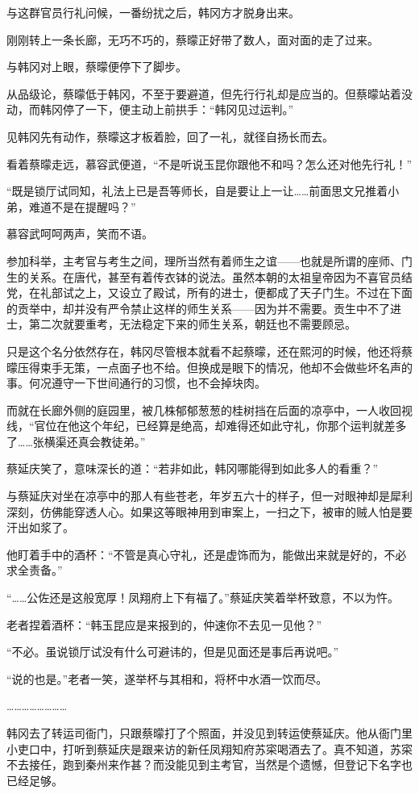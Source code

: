 与这群官员行礼问候，一番纷扰之后，韩冈方才脱身出来。

刚刚转上一条长廊，无巧不巧的，蔡曚正好带了数人，面对面的走了过来。

与韩冈对上眼，蔡曚便停下了脚步。

从品级论，蔡曚低于韩冈，不至于要避道，但先行行礼却是应当的。但蔡曚站着没动，而韩冈停了一下，便主动上前拱手：“韩冈见过运判。”

见韩冈先有动作，蔡曚这才板着脸，回了一礼，就径自扬长而去。

看着蔡曚走远，慕容武便道，“不是听说玉昆你跟他不和吗？怎么还对他先行礼！”

“既是锁厅试同知，礼法上已是吾等师长，自是要让上一让……前面思文兄推着小弟，难道不是在提醒吗？”

慕容武呵呵两声，笑而不语。

参加科举，主考官与考生之间，理所当然有着师生之谊——也就是所谓的座师、门生的关系。在唐代，甚至有着传衣钵的说法。虽然本朝的太祖皇帝因为不喜官员结党，在礼部试之上，又设立了殿试，所有的进士，便都成了天子门生。不过在下面的贡举中，却并没有严令禁止这样的师生关系——因为并不需要。贡生中不了进士，第二次就要重考，无法稳定下来的师生关系，朝廷也不需要顾忌。

只是这个名分依然存在，韩冈尽管根本就看不起蔡曚，还在熙河的时候，他还将蔡曚压得束手无策，一点面子也不给。但换成是眼下的情况，他却不会做些坏名声的事。何况遵守一下世间通行的习惯，也不会掉块肉。

而就在长廊外侧的庭园里，被几株郁郁葱葱的桂树挡在后面的凉亭中，一人收回视线，“官位在他这个年纪，已经算是绝高，却难得还如此守礼，你那个运判就差多了……张横渠还真会教徒弟。”

蔡延庆笑了，意味深长的道：“若非如此，韩冈哪能得到如此多人的看重？”

与蔡延庆对坐在凉亭中的那人有些苍老，年岁五六十的样子，但一对眼神却是犀利深刻，仿佛能穿透人心。如果这等眼神用到审案上，一扫之下，被审的贼人怕是要汗出如浆了。

他盯着手中的酒杯：“不管是真心守礼，还是虚饰而为，能做出来就是好的，不必求全责备。”

“……公佐还是这般宽厚！凤翔府上下有福了。”蔡延庆笑着举杯致意，不以为忤。

老者捏着酒杯：“韩玉昆应是来报到的，仲速你不去见一见他？”

“不必。虽说锁厅试没有什么可避讳的，但是见面还是事后再说吧。”

“说的也是。”老者一笑，遂举杯与其相和，将杯中水酒一饮而尽。

……………………

韩冈去了转运司衙门，只跟蔡曚打了个照面，并没见到转运使蔡延庆。他从衙门里小吏口中，打听到蔡延庆是跟来访的新任凤翔知府苏寀喝酒去了。真不知道，苏寀不去接任，跑到秦州来作甚？而没能见到主考官，当然是个遗憾，但登记下名字也已经足够。

